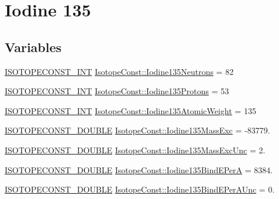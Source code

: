 \hypertarget{group___isotope_const-_iodine-_i135}{}\section{Iodine 135}
\label{group___isotope_const-_iodine-_i135}
\subsection*{Variables}
\begin{DoxyCompactItemize}
\item 
\mbox{\hyperlink{group___isotope_const-_macros_ga5f18360b3e99483a35c32d789e62621c}{I\+S\+O\+T\+O\+P\+E\+C\+O\+N\+S\+T\+\_\+\+I\+NT}} \mbox{\hyperlink{group___isotope_const-_iodine-_i135_ga0f80428521e0b1d43b24ed61125e6463}{Isotope\+Const\+::\+Iodine135\+Neutrons}} = 82
\item 
\mbox{\hyperlink{group___isotope_const-_macros_ga5f18360b3e99483a35c32d789e62621c}{I\+S\+O\+T\+O\+P\+E\+C\+O\+N\+S\+T\+\_\+\+I\+NT}} \mbox{\hyperlink{group___isotope_const-_iodine-_i135_ga555fcaddb756e0d4372d07e8ec7dbd93}{Isotope\+Const\+::\+Iodine135\+Protons}} = 53
\item 
\mbox{\hyperlink{group___isotope_const-_macros_ga5f18360b3e99483a35c32d789e62621c}{I\+S\+O\+T\+O\+P\+E\+C\+O\+N\+S\+T\+\_\+\+I\+NT}} \mbox{\hyperlink{group___isotope_const-_iodine-_i135_ga73d869f7a4fbb7b9812ec4e117586421}{Isotope\+Const\+::\+Iodine135\+Atomic\+Weight}} = 135
\item 
\mbox{\hyperlink{group___isotope_const-_macros_ga8f45a7272ce02c0b4c65c44636ed719a}{I\+S\+O\+T\+O\+P\+E\+C\+O\+N\+S\+T\+\_\+\+D\+O\+U\+B\+LE}} \mbox{\hyperlink{group___isotope_const-_iodine-_i135_ga95954d5a2b862b33b4bd77c8737212bd}{Isotope\+Const\+::\+Iodine135\+Mass\+Exc}} = -\/83779.
\item 
\mbox{\hyperlink{group___isotope_const-_macros_ga8f45a7272ce02c0b4c65c44636ed719a}{I\+S\+O\+T\+O\+P\+E\+C\+O\+N\+S\+T\+\_\+\+D\+O\+U\+B\+LE}} \mbox{\hyperlink{group___isotope_const-_iodine-_i135_ga4a2d5e96103c1ce22dde4dcf390b1efa}{Isotope\+Const\+::\+Iodine135\+Mass\+Exc\+Unc}} = 2.
\item 
\mbox{\hyperlink{group___isotope_const-_macros_ga8f45a7272ce02c0b4c65c44636ed719a}{I\+S\+O\+T\+O\+P\+E\+C\+O\+N\+S\+T\+\_\+\+D\+O\+U\+B\+LE}} \mbox{\hyperlink{group___isotope_const-_iodine-_i135_gae704abb98df325452852a896bcfc9ae9}{Isotope\+Const\+::\+Iodine135\+Bind\+E\+PerA}} = 8384.
\item 
\mbox{\hyperlink{group___isotope_const-_macros_ga8f45a7272ce02c0b4c65c44636ed719a}{I\+S\+O\+T\+O\+P\+E\+C\+O\+N\+S\+T\+\_\+\+D\+O\+U\+B\+LE}} \mbox{\hyperlink{group___isotope_const-_iodine-_i135_ga4c36143a0b27e20d23408a13c89c1c15}{Isotope\+Const\+::\+Iodine135\+Bind\+E\+Per\+A\+Unc}} = 0.

\end{DoxyCompactItemize}
